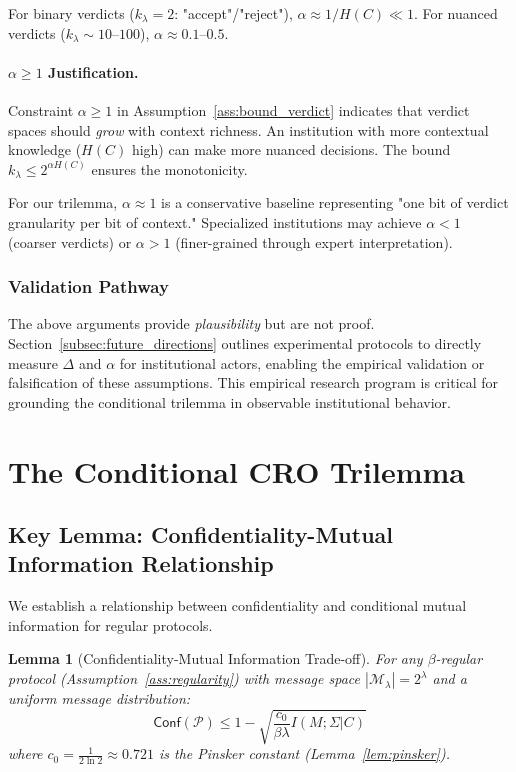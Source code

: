 \documentclass{ieeeaccess}
\newcommand{\Conf}{\mathsf{Conf}}
\newtheorem{lemma}{Lemma}[subsection]
\begin{document}
For binary verdicts ($k_\lambda = 2$: "accept"/"reject"), $\alpha \approx 1/H(C) \ll 1$. For nuanced verdicts ($k_\lambda \sim 10$--$100$), $\alpha \approx 0.1$--$0.5$.

\paragraph{$\alpha \geq 1$ Justification.}
Constraint $\alpha \geq 1$ in Assumption~\ref{ass:bound_verdict} indicates that verdict spaces should \emph{grow} with context richness. An institution with more contextual knowledge ($H(C)$ high) can make more nuanced decisions. The bound $k_\lambda \leq 2^{\alpha H(C)}$ ensures the monotonicity.

For our trilemma, $\alpha \approx 1$ is a conservative baseline representing "one bit of verdict granularity per bit of context." Specialized institutions may achieve $\alpha < 1$ (coarser verdicts) or $\alpha > 1$ (finer-grained through expert interpretation).

\subsubsection{Validation Pathway}

The above arguments provide \emph{plausibility} but are not proof. Section~\ref{subsec:future_directions} outlines experimental protocols to directly measure $\Delta$ and $\alpha$ for institutional actors, enabling the empirical validation or falsification of these assumptions. This empirical research program is critical for grounding the conditional trilemma in observable institutional behavior.

\section{The Conditional CRO Trilemma}\label{sec:cro_trilemma}

\subsection{Key Lemma: Confidentiality-Mutual Information Relationship}

We establish a relationship between confidentiality and conditional mutual information for regular protocols.

\begin{lemma}[Confidentiality-Mutual Information Trade-off]\label{lem:conf_mi_regular}
For any $\beta$-regular protocol (Assumption~\ref{ass:regularity}) with message space $|\mathcal{M}_\lambda| = 2^\lambda$ and a uniform message distribution:
\begin{equation}
\Conf(\mathcal{P}) \leq 1 - \sqrt{\frac{c_0}{\beta\lambda} I(M;\Sigma|C)}
\end{equation}
where $c_0 = \frac{1}{2\ln 2} \approx 0.721$ is the Pinsker constant (Lemma~\ref{lem:pinsker}).
\end{lemma}
\end{document}
